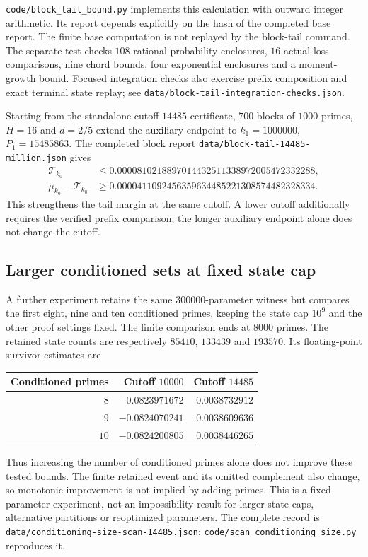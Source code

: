 \documentclass[11pt]{article}
\begin{document}
\texttt{code/block\_tail\_bound.py} implements this calculation with
outward integer arithmetic. Its report depends explicitly on the hash
of the completed base report. The finite base computation is not replayed
by the block-tail command. The separate test checks $108$ rational
probability enclosures, $16$ actual-loss comparisons, nine chord bounds,
four exponential enclosures and a moment-growth bound. Focused
integration checks also exercise prefix composition and exact terminal
state replay; see \texttt{data/block-tail-integration-checks.json}.

Starting from the standalone cutoff $14485$ certificate, $700$ blocks
of $1000$ primes, $H=16$ and $d=2/5$ extend the auxiliary endpoint to
$k_1=1000000$, $P_1=15485863$. The completed block report
\texttt{data/block-tail-14485-million.json} gives
\begin{align*}
 \mathcal T_{k_0}&\leq0.0000810218897014432511338972005472332288,\\
 \mu_{k_0}-\mathcal T_{k_0}
 &\geq0.0000411092456359634485221308574482328334.
\end{align*}
This strengthens the tail margin at the same cutoff. A lower cutoff
additionally requires the verified prefix comparison; the longer
auxiliary endpoint alone does not change the cutoff.

\subsection{Larger conditioned sets at fixed state cap}
A further experiment retains the same $300000$-parameter witness but
compares the first eight, nine and ten conditioned primes, keeping the
state cap $10^9$ and the other proof settings fixed. The finite comparison
ends at $8000$ primes. The retained state counts are respectively $85410$,
$133439$ and $193570$. Its floating-point survivor estimates are
\begin{center}
\begin{tabular}{rrr}
\toprule
Conditioned primes & Cutoff $10000$ & Cutoff $14485$\\
\midrule
$8$ & $-0.0823971672$ & $0.0038732912$\\
$9$ & $-0.0824070241$ & $0.0038609636$\\
$10$ & $-0.0824200805$ & $0.0038446265$\\
\bottomrule
\end{tabular}
\end{center}
Thus increasing the number of conditioned primes alone does not improve
these tested bounds. The finite retained event and its omitted complement
also change, so monotonic improvement is not implied by adding primes.
This is a fixed-parameter experiment, not an impossibility result for
larger state caps, alternative partitions or reoptimized parameters.
The complete record is \texttt{data/conditioning-size-scan-14485.json};
\texttt{code/scan\_conditioning\_size.py} reproduces it.
\end{document}
